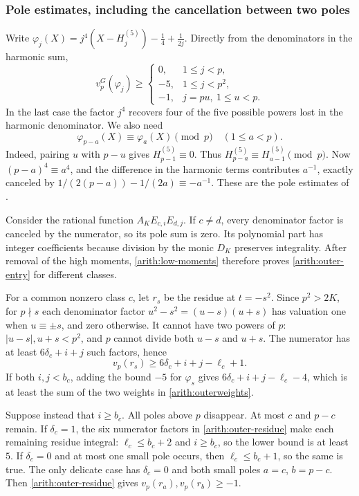 \subsubsection*{Pole estimates, including the cancellation between two poles}

Write
$\varphi_j(X)=j^4(X-H_j^{(5)})-\tfrac14+\tfrac1{2j}$.
Directly from the denominators in the harmonic sum,
\[
 v_p^G(\varphi_j)\ge
 \begin{cases}
 0,&1\le j<p,\\
 -5,&1\le j<p^2,\\
 -1,&j=pu,\ 1\le u<p.
 \end{cases}
\]
In the last case the factor $j^4$ recovers four of the five possible
powers lost in the harmonic denominator.
We also need
\begin{equation}\label{arith:pole-congruence}
 \varphi_{p-a}(X)\equiv\varphi_a(X)\pmod p
 \quad(1\le a<p).
\end{equation}
Indeed, pairing $u$ with $p-u$ gives $H_{p-1}^{(5)}\equiv0$.
Thus $H_{p-a}^{(5)}\equiv H_{a-1}^{(5)}\pmod p$.
Now $(p-a)^4\equiv a^4$, and the difference in the harmonic terms
contributes $a^{-1}$, exactly canceled by
$1/(2(p-a))-1/(2a)\equiv-a^{-1}$.
These are the pole estimates of
\cite[\texttt{PoleVal.lean}]{firsching}.

Consider the rational function $A_KE_{c,i}E_{d,j}$.
If $c\ne d$, every denominator factor is canceled by the numerator,
so its pole sum is zero. Its polynomial part has integer coefficients
because division by the monic $D_K$ preserves integrality.
After removal of the high moments, \eqref{arith:low-moments}
therefore proves \eqref{arith:outer-entry} for different classes.

For a common nonzero class $c$, let $r_s$ be the residue at $t=-s^2$.
Since $p^2>2K$, for $p\nmid s$ each denominator factor
$u^2-s^2=(u-s)(u+s)$ has valuation one when $u\equiv\pm s$,
and zero otherwise. It cannot have two powers of $p$:
$|u-s|,u+s<p^2$, and $p$ cannot divide both $u-s$ and $u+s$.
The numerator has at least $6\delta_c+i+j$ such factors, hence
\begin{equation}\label{arith:outer-residue}
 v_p(r_s)\ge6\delta_c+i+j-\ell_c+1.
\end{equation}
If both $i,j<b_c$, adding the bound $-5$ for $\varphi_s$ gives
$6\delta_c+i+j-\ell_c-4$, which is at least the sum of the
two weights in \eqref{arith:outerweights}.

Suppose instead that $i\ge b_c$. All poles above $p$ disappear.
At most $c$ and $p-c$ remain. If $\delta_c=1$, the six numerator
factors in \eqref{arith:outer-residue} make each remaining residue
integral: $\ell_c\le b_c+2$ and $i\ge b_c$, so the lower bound
is at least $5$. If $\delta_c=0$ and at most one small pole occurs, then
$\ell_c\le b_c+1$, so the same is true. The only delicate case
has $\delta_c=0$ and both small poles $a=c$, $b=p-c$.
Then \eqref{arith:outer-residue} gives $v_p(r_a),v_p(r_b)\ge-1$.

